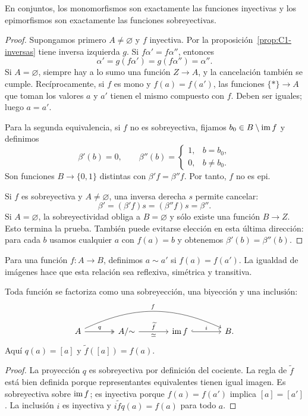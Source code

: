 \begin{prop}\label{prop:C1-monoepi}
En conjuntos, los monomorfismos son exactamente las funciones inyectivas y los epimorfismos son exactamente las funciones sobreyectivas.
\end{prop}
\begin{proof}
Supongamos primero $A\ne\varnothing$ y $f$ inyectiva. Por la proposición~\ref{prop:C1-inversas} tiene inversa izquierda $g$. Si $f\alpha'=f\alpha''$, entonces
\[
\alpha'=g(f\alpha')=g(f\alpha'')=\alpha''.
\]
Si $A=\varnothing$, siempre hay a lo sumo una función $Z\to A$, y la cancelación también se cumple. Recíprocamente, si $f$ es mono y $f(a)=f(a')$, las funciones $\{*\}\to A$ que toman los valores $a$ y $a'$ tienen el mismo compuesto con $f$. Deben ser iguales; luego $a=a'$.

Para la segunda equivalencia, si $f$ no es sobreyectiva, fijamos $b_0\in B\setminus\operatorname{im} f$ y definimos
\[
\beta'(b)=0,\qquad
\beta''(b)=\begin{cases}1,&b=b_0,\\0,&b\ne b_0.\end{cases}
\]
Son funciones $B\to\{0,1\}$ distintas con $\beta'f=\beta''f$. Por tanto, $f$ no es epi.

Si $f$ es sobreyectiva y $A\ne\varnothing$, una inversa derecha $s$ permite cancelar:
\[
\beta'=(\beta'f)s=(\beta''f)s=\beta''.
\]
Si $A=\varnothing$, la sobreyectividad obliga a $B=\varnothing$ y sólo existe una función $B\to Z$. Esto termina la prueba. También puede evitarse elección en esta última dirección: para cada $b$ usamos cualquier $a$ con $f(a)=b$ y obtenemos $\beta'(b)=\beta''(b)$.
\end{proof}

Para una función $f:A\to B$, definimos $a\sim a'$ si $f(a)=f(a')$. La igualdad de imágenes hace que esta relación sea reflexiva, simétrica y transitiva.
\begin{teo}\label{teo:C1-factorizacion}
Toda función se factoriza como una sobreyección, una biyección y una inclusión:
\[
\begin{tikzcd}[column sep=large]
A\arrow[r,two heads,"q"]\arrow[rrr,bend left=25,"f"]
&A/{\sim}\arrow[r,"\widetilde f","\simeq"']
&\im f\arrow[r,hook,"i"]&B.
\end{tikzcd}
\]
Aquí $q(a)=[a]$ y $\widetilde f([a])=f(a)$.
\end{teo}
\begin{proof}
La proyección $q$ es sobreyectiva por definición del cociente. La regla de $\widetilde f$ está bien definida porque representantes equivalentes tienen igual imagen. Es sobreyectiva sobre $\operatorname{im} f$; es inyectiva porque $f(a)=f(a')$ implica $[a]=[a']$. La inclusión $i$ es inyectiva y $i\widetilde f q(a)=f(a)$ para todo $a$.
\end{proof}
